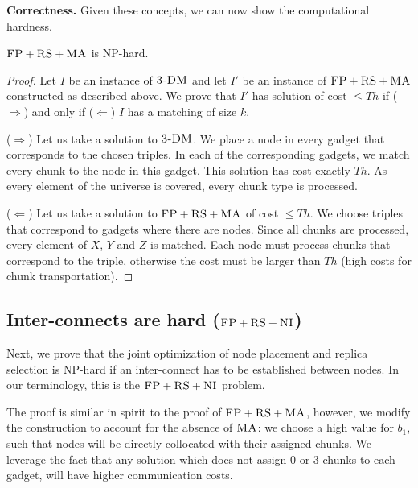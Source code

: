 \documentclass[9pt]{sigcomm-alternate}
\newcommand{\CC}{\textsc{NI}}
\newcommand{\FP}{\textsc{FP}}
\newcommand{\RS}{\textsc{RS}}
\newcommand{\MA}{\textsc{MA}}
\newcommand{\CostTrans}{\ensuremath{b_1}}
\newcommand{\TDM}{\textsc{3-DM}}
\newcommand{\Thr}{\ensuremath{Th}}
\begin{document}
\textbf{Correctness.}
Given these concepts, we can now show the computational hardness.
\begin{theorem}
$\FP+\RS+\MA$ is NP-hard.
\end{theorem}
\begin{proof}
Let $I$ be an instance of $\TDM$ and let $I'$ be an instance of
$\FP+\RS+\MA$ constructed as described above. We prove that $I'$ has solution of cost $\leq \Thr$ if ($\Rightarrow$) and only if
($\Leftarrow$)
$I$ has a matching of size $k$.

($\Rightarrow$) Let us take a solution to $\TDM$. We place a node in every
gadget that corresponds to the chosen triples. In each of the corresponding
gadgets, we match every chunk to the node in this gadget. This
solution has
cost exactly $\Thr$. As every element of the universe is covered, every
chunk type is processed.

($\Leftarrow$) Let us take a solution to $\FP+\RS+\MA$ of cost $\leq \Thr$. We
choose triples that correspond to gadgets where there are nodes. Since
all chunks are processed, every element of $X$, $Y$ and $Z$ is matched. Each
node must process chunks that
correspond to the triple, otherwise the
cost must be larger than $\Thr$ (high costs for chunk
transportation).
\end{proof}


\subsection{Inter-connects are hard ($\FP+\RS+\CC$)}\label{ssec:fprscc}


Next, we prove that the joint optimization of node placement and replica selection
is NP-hard if an inter-connect has to be established between nodes.
In our terminology, this is the $\FP+\RS+\CC$ problem.

The proof is similar in spirit to the proof of $\FP+\RS+\MA$, however,
we modify the construction to account for the absence of $\MA$:
we choose
a high value for $\CostTrans$, such that nodes will be directly collocated with
their assigned chunks. We leverage the fact that any solution which does not
assign 0 or 3 chunks to each gadget, will have higher communication costs.
\end{document}
